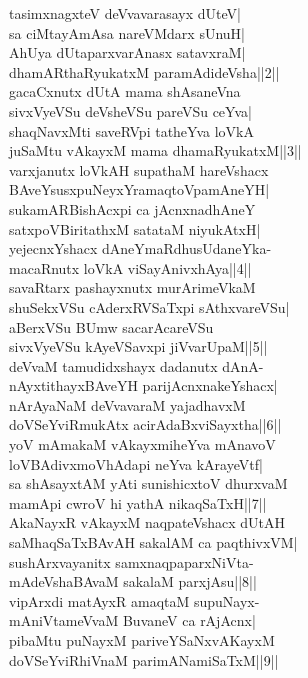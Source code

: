 \documentclass{article}
\begin{document}
tasimxnagxteV deVvavarasayx dUteV|\\
sa ciMtayAmAsa nareVMdarx sUnuH|\\
AhUya dUtaparxvarAnasx satavxraM|\\
dhamARthaRyukatxM paramAdideVsha||2||\\
gacaCxnutx dUtA mama shAsaneVna\\
sivxVyeVSu deVsheVSu pareVSu ceYva|\\
shaqNavxMti saveRVpi tatheYva loVkA\\
juSaMtu vAkayxM mama dhamaRyukatxM||3||\\
varxjanutx loVkAH supathaM hareVshacx\\
BAveYsusxpuNeyxYramaqtoVpamAneYH|\\
sukamARBishAcxpi ca jAcnxnadhAneY\\
satxpoVBiritathxM satataM niyukAtxH|\\
yejecnxYshacx dAneYmaRdhusUdaneYka-\\
macaRnutx loVkA viSayAnivxhAya||4||\\
savaRtarx pashayxnutx murArimeVkaM\\
shuSekxVSu cAderxRVSaTxpi sAthxvareVSu|\\
aBerxVSu BUmw sacarAcareVSu\\
sivxVyeVSu kAyeVSavxpi jiVvarUpaM||5||\\
deVvaM tamudidxshayx dadanutx dAnA-\\
nAyxtithayxBAveYH parijAcnxnakeYshacx|\\
nArAyaNaM deVvavaraM yajadhavxM\\
doVSeYviRmukAtx acirAdaBxviSayxtha||6||\\
yoV mAmakaM vAkayxmiheYva mAnavoV\\
loVBAdivxmoVhAdapi neYva kArayeVtf|\\
sa shAsayxtAM yAti sunishicxtoV dhurxvaM\\
mamApi cwroV hi yathA nikaqSaTxH||7||\\
AkaNayxR vAkayxM naqpateVshacx dUtAH\\
saMhaqSaTxBAvAH sakalAM ca paqthivxVM|\\
sushArxvayanitx samxnaqpaparxNiVta-\\
mAdeVshaBAvaM sakalaM parxjAsu||8||\\
vipArxdi matAyxR amaqtaM supuNayx-\\
mAniVtameVvaM BuvaneV ca rAjAcnx|\\
pibaMtu puNayxM pariveYSaNxvAKayxM\\
doVSeYviRhiVnaM parimANamiSaTxM||9||\\
\end{document}
